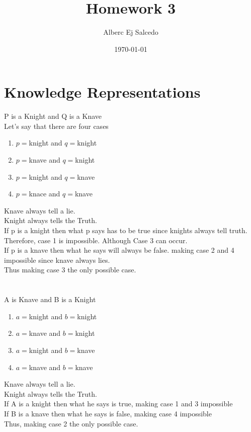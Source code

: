 \documentclass[11pt]{article}
\title{Homework 3}
\author{Alberc Ej Salcedo}
\date{\today}
\begin{document}
\maketitle

\section{Knowledge Representations}

P is a Knight and Q is a Knave\\
Let's say that there are four cases\\
\begin{enumerate}
\item $p = $knight and $q = $knight
\item $p = $knave and $q = $knight
\item $p = $knight and $q = $knave
\item $p = $knace and $q = $knave
\end{enumerate}
Knave always tell a lie.\\
Knight always tells the Truth.\\
If p is a knight then what p says has to be true since knights always tell truth. Therefore, case 1 is impossible. Although Case 3 can occur.\\
If p is a knave then what he says will always be false. making case 2 and 4 impossible since knave always lies.\\
Thus making case 3 the only possible case.\\
\\
\\
A is Knave and B is a Knight
\begin{enumerate}
\item $a = $knight and $b = $knight
\item $a = $knave and $b = $knight
\item $a = $knight and $b = $knave
\item $a = $knave and $b = $knave
\end{enumerate}
Knave always tell a lie.\\
Knight always tells the Truth.\\
If A is a knight then what he says is true, making case 1 and 3 impossible\\
If B is a knave then what he says is false, making case 4 impossible\\
Thus, making case 2 the only possible case.\\
\end{document}

